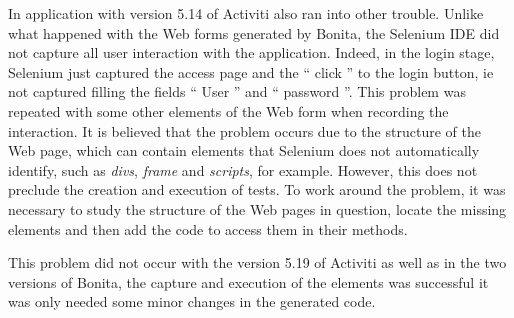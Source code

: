 \documentclass[runningheads,a4paper]{llncs}
\begin{document}

In application with version 5.14 of Activiti also ran into other trouble. Unlike what happened with the Web forms generated by Bonita, the Selenium IDE did not capture all user interaction with the application. Indeed, in the login stage, Selenium just captured the access page and the `` click '' to the login button, ie not captured filling the fields `` User '' and `` password ''. This problem was repeated with some other elements of the Web form when recording the interaction. It is believed that the problem occurs due to the structure of the Web page, which can contain elements that Selenium does not automatically identify, such as \emph{divs}, \emph{frame} and \emph{scripts}, for example. However, this does not preclude the creation and execution of tests. To work around the problem, it was necessary to study the structure of the Web pages in question, locate the missing elements and then add the code to access them in their methods. 

This problem did not occur with the version 5.19 of Activiti as well as in the two versions of Bonita, the capture and execution of the elements was successful it was only needed some minor changes in the generated code.
\end{document}
